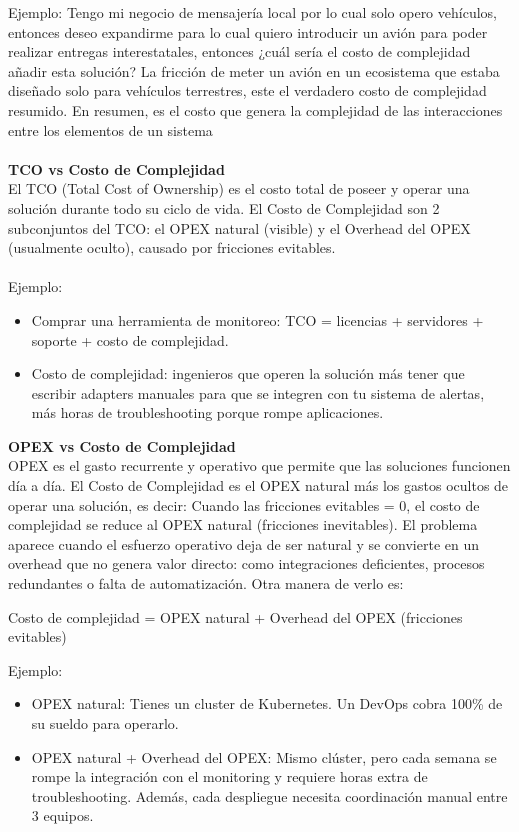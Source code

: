Ejemplo: Tengo mi negocio de mensajería local por lo cual solo opero vehículos, entonces deseo expandirme para 
lo cual quiero introducir un avión para poder realizar entregas interestatales, entonces ¿cuál sería el 
costo de complejidad añadir esta solución? La fricción de meter un avión en un ecosistema que estaba diseñado 
solo para vehículos terrestres, este el verdadero costo de complejidad resumido. 
En resumen, es el costo que genera la complejidad de las interacciones entre los elementos de un sistema
\\
\\
{\textbf{TCO vs Costo de Complejidad}}
\\
El TCO (Total Cost of Ownership) es el costo total de poseer y operar una solución durante todo su ciclo de vida. 
El Costo de Complejidad son 2 subconjuntos del TCO: el OPEX natural (visible) y el Overhead del
OPEX (usualmente oculto), causado por fricciones evitables.
\\
\\
Ejemplo:
\begin{itemize}
\item Comprar una herramienta de monitoreo: TCO = licencias + servidores + soporte + costo de complejidad.
\item Costo de complejidad: ingenieros que operen la solución más tener que escribir adapters manuales 
para que se integren con tu sistema de alertas, más horas de troubleshooting porque rompe aplicaciones.
\\
\end{itemize} 


{\textbf{OPEX vs Costo de Complejidad}}
\\
OPEX es el gasto recurrente y operativo que permite que las soluciones funcionen día a día. 
El Costo de Complejidad es el OPEX natural más los gastos ocultos de operar una solución, es decir:
Cuando las fricciones evitables = 0, el costo de complejidad se reduce al OPEX natural (fricciones inevitables). 
El problema aparece cuando el esfuerzo operativo deja de ser natural y se convierte en un overhead que no genera 
valor directo: como integraciones deficientes, procesos redundantes o falta de automatización.
Otra manera de verlo es: 
\begin{center}
Costo de complejidad = OPEX natural + Overhead del OPEX (fricciones evitables)
\end{center}

Ejemplo:
\begin{itemize}
\item OPEX natural: Tienes un cluster de Kubernetes. Un DevOps cobra 100\% de su sueldo para operarlo.
\item OPEX natural + Overhead del OPEX: Mismo clúster, pero cada semana se rompe la integración con el 
monitoring y requiere horas extra de troubleshooting. Además, cada despliegue necesita coordinación manual entre 3 equipos.
\end{itemize} 

